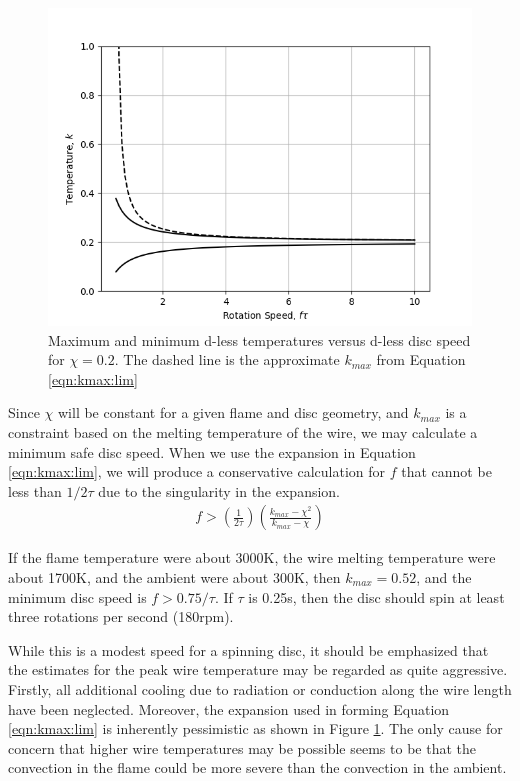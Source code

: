 \begin{figure}
\begin{center}
\includegraphics[width=0.9\linewidth]{convection.png}
\caption{Maximum and minimum d-less temperatures versus d-less disc speed for $\chi=0.2$.  The dashed line is the approximate $k_{max}$ from Equation \ref{eqn:kmax:lim}}\label{fig:convection}
\end{center}
\end{figure}

Since $\chi$ will be constant for a given flame and disc geometry, and $k_{max}$ is a constraint based on the melting temperature of the wire, we may calculate a minimum safe disc speed.  When we use the expansion in Equation \ref{eqn:kmax:lim}, we will produce a conservative calculation for $f$ that cannot be less than $1/2\tau$ due to the singularity in the expansion.
\begin{align}
f > \left(\frac{1}{2\tau}\right)\left(\frac{k_{max}-\chi^2}{k_{max}-\chi}\right)
\end{align}

If the flame temperature were about 3000K, the wire melting temperature were about 1700K, and the ambient were about 300K, then $k_{max} = 0.52$, and the minimum disc speed is $f > 0.75 / \tau$.  If $\tau$ is 0.25s, then the disc should spin at least three rotations per second (180rpm).

While this is a modest speed for a spinning disc, it should be emphasized that the estimates for the peak wire temperature may be regarded as quite aggressive.  Firstly, all additional cooling due to radiation or conduction along the wire length have been neglected.  Moreover, the expansion used in forming Equation \ref{eqn:kmax:lim} is inherently pessimistic as shown in Figure \ref{fig:convection}.  The only cause for concern that higher wire temperatures may be possible seems to be that the convection in the flame could be more severe than the convection in the ambient.

